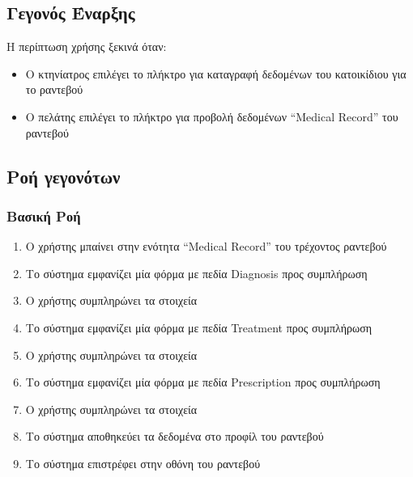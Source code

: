 \documentclass[12pt,a4paper,twoside]{book}
\begin{document}
\subsection{Γεγονός Έναρξης}
Η περίπτωση χρήσης ξεκινά όταν:
\begin{itemize}
  \item Ο κτηνίατρος επιλέγει το πλήκτρο για καταγραφή δεδομένων του κατοικίδιου για το ραντεβού  %
  \item Ο πελάτης επιλέγει το πλήκτρο για προβολή δεδομένων “Medical Record” του ραντεβού %
\end{itemize}

\subsection{Ροή γεγονότων}

\subsubsection{Βασική Ροή}
\begin{enumerate}
  \item Ο χρήστης μπαίνει στην ενότητα “Medical Record” του τρέχοντος ραντεβού  %
  \item Το σύστημα εμφανίζει μία φόρμα με πεδία Diagnosis προς συμπλήρωση %
  \item Ο χρήστης συμπληρώνει τα στοιχεία  %
  \item Το σύστημα εμφανίζει μία φόρμα με πεδία Treatment προς συμπλήρωση  %
  \item Ο χρήστης συμπληρώνει τα στοιχεία   %
  \item Το σύστημα εμφανίζει μία φόρμα με πεδία Prescription προς συμπλήρωση  %
  \item Ο χρήστης συμπληρώνει τα στοιχεία  %
  \item Το σύστημα αποθηκεύει τα δεδομένα στο προφίλ του ραντεβού  %
  \item Το σύστημα επιστρέφει στην οθόνη του ραντεβού
\end{enumerate}
\end{document}
